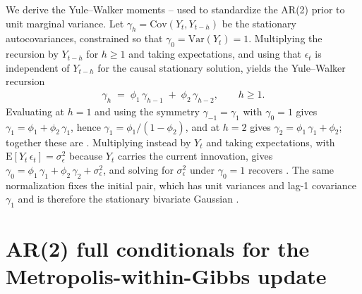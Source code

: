\documentclass[12pt]{article}
\begin{document}
We derive the Yule--Walker moments -- used to standardize the AR(2) prior  to unit marginal variance.  Let $\gamma_h = \mathrm{Cov}(Y_t, Y_{t-h})$ be the stationary autocovariances, constrained so that $\gamma_0 = \mathrm{Var}(Y_t) = 1$.  Multiplying the recursion  by $Y_{t-h}$ for $h \ge 1$ and taking expectations, and using that $\epsilon_t$ is independent of $Y_{t-h}$ for the causal stationary solution, yields the Yule--Walker recursion
\begin{align}
  \gamma_h \;=\; \phi_1\, \gamma_{h-1} \;+\; \phi_2\, \gamma_{h-2}, \qquad h \ge 1. \label{eq:yw}
\end{align}
Evaluating  at $h = 1$ and using the symmetry $\gamma_{-1} = \gamma_1$ with $\gamma_0 = 1$ gives $\gamma_1 = \phi_1 + \phi_2\, \gamma_1$, hence $\gamma_1 = \phi_1 / (1 - \phi_2)$, and at $h = 2$ gives $\gamma_2 = \phi_1\, \gamma_1 + \phi_2$; together these are .  Multiplying  instead by $Y_t$ and taking expectations, with $\mathrm{E}[Y_t\, \epsilon_t] = \sigma_\epsilon^2$ because $Y_t$ carries the current innovation, gives $\gamma_0 = \phi_1\, \gamma_1 + \phi_2\, \gamma_2 + \sigma_\epsilon^2$, and solving for $\sigma_\epsilon^2$ under $\gamma_0 = 1$ recovers .  The same normalization fixes the initial pair, which has unit variances and lag-1 covariance $\gamma_1$ and is therefore the stationary bivariate Gaussian .

\section{AR(2) full conditionals for the Metropolis-within-Gibbs update}\label{app:full-cond}
\end{document}
